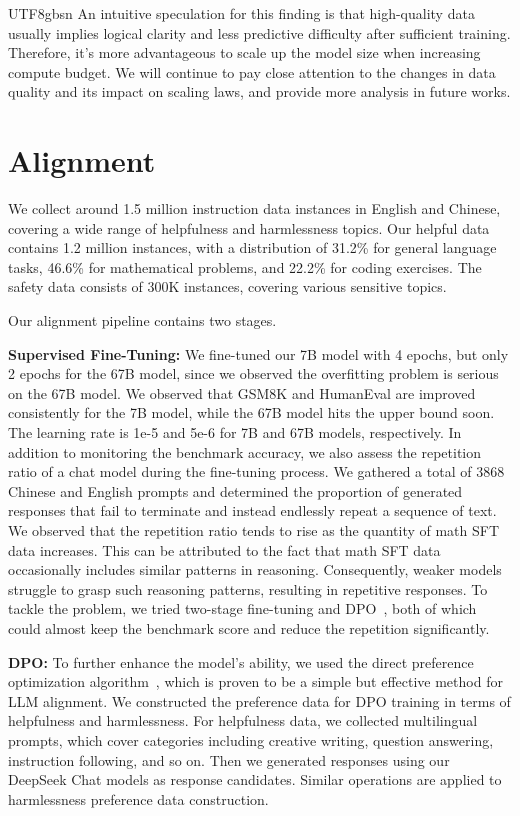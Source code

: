 \documentclass[11pt, a4paper, logo, copyright, nonumbering]{deepseek}
\begin{document}
\begin{CJK*}{UTF8}{gbsn}
An intuitive speculation for this finding is that high-quality data usually implies logical clarity and less predictive difficulty after sufficient training. Therefore, it's more advantageous to scale up the model size when increasing compute budget. We will continue to pay close attention to the changes in data quality and its impact on scaling laws, and provide more analysis in future works.


\section{Alignment}
\label{sec:alignment}

We collect around 1.5 million instruction data instances in English and Chinese, covering a wide range of helpfulness and harmlessness topics.  Our helpful data contains 1.2 million instances,  with a distribution of 31.2\% for general language tasks, 46.6\% for mathematical problems, and 22.2\% for coding exercises. The safety data consists of 300K instances, covering various sensitive topics. 

Our alignment pipeline contains two stages. 

\textbf{Supervised Fine-Tuning: } We fine-tuned our 7B model with 4 epochs, but only 2 epochs for the 67B model, since we observed the overfitting problem is serious on the 67B model. We observed that GSM8K \citep{gsm8k} and HumanEval \citep{codex} are improved consistently for the 7B model, while the 67B model hits the upper bound soon. The learning rate is 1e-5 and 5e-6 for 7B and 67B models, respectively. 
In addition to monitoring the benchmark accuracy, we also assess the repetition ratio of a chat model during the fine-tuning process. We gathered a total of 3868 Chinese and English prompts and determined the proportion of generated responses that fail to terminate and instead endlessly repeat a sequence of text. We observed that the repetition ratio tends to rise as the quantity of math SFT data increases. This can be attributed to the fact that math SFT data occasionally includes similar patterns in reasoning. Consequently, weaker models struggle to grasp such reasoning patterns, resulting in repetitive responses. To tackle the problem, we tried two-stage fine-tuning and DPO~\citep{dpo}, both of which could almost keep the benchmark score and reduce the repetition significantly. 

\textbf{DPO: }To further enhance the model's ability, we used the direct preference optimization algorithm~\citep{dpo}, which is proven to be a simple but effective method for LLM alignment.
We constructed the preference data for DPO training in terms of helpfulness and harmlessness.
For helpfulness data, we collected multilingual prompts, which cover categories including creative writing, question answering, instruction following, and so on. Then we generated responses using our DeepSeek Chat models as response candidates.
Similar operations are applied to harmlessness preference data construction.


\end{CJK*}
\end{document}
